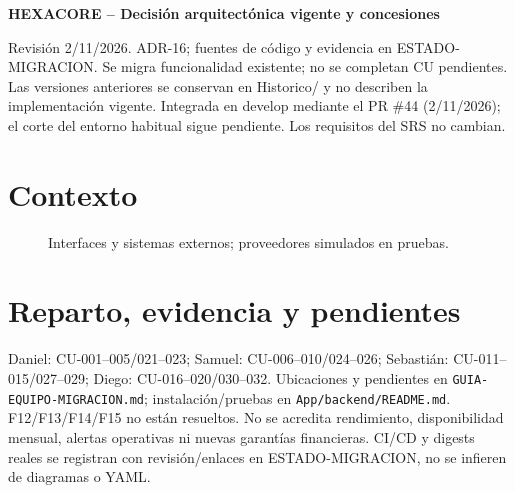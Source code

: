 \documentclass[12pt,a4paper]{article}
\begin{document}
\sloppy
\begin{center}\LARGE\textbf{HEXACORE -- Decisión arquitectónica vigente y concesiones}\end{center}
\noindent Revisión 2/11/2026. ADR-16; fuentes de código y evidencia en ESTADO-MIGRACION.
Se migra funcionalidad existente; no se completan CU pendientes. Las versiones anteriores
se conservan en Historico/ y no describen la implementación vigente. Integrada en develop mediante el PR \#44
(2/11/2026); el corte del entorno habitual sigue pendiente. Los requisitos del SRS no cambian.
\tableofcontents
\section{Contexto}
\begin{figure}[H]\centering\HexContexto\caption{Interfaces y sistemas externos; proveedores simulados en pruebas.}\end{figure}

\section{Reparto, evidencia y pendientes}
Daniel: CU-001--005/021--023; Samuel: CU-006--010/024--026; Sebastián:
CU-011--015/027--029; Diego: CU-016--020/030--032. Ubicaciones y pendientes en
\texttt{GUIA-EQUIPO-MIGRACION.md}; instalación/pruebas en \texttt{App/backend/README.md}.
F12/F13/F14/F15 no están resueltos. No se acredita rendimiento, disponibilidad mensual,
alertas operativas ni nuevas garantías financieras. CI/CD y digests reales se registran
con revisión/enlaces en ESTADO-MIGRACION, no se infieren de diagramas o YAML.

\end{document}
